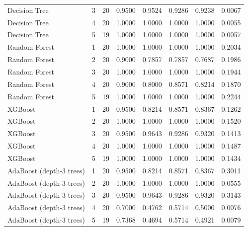 \begin{tabular}{lrrrrrrr}
Decision Tree & 3 & 20 & 0.9500 & 0.9524 & 0.9286 & 0.9238 & 0.0067 \\
Decision Tree & 4 & 20 & 1.0000 & 1.0000 & 1.0000 & 1.0000 & 0.0055 \\
Decision Tree & 5 & 19 & 1.0000 & 1.0000 & 1.0000 & 1.0000 & 0.0057 \\
Random Forest & 1 & 20 & 1.0000 & 1.0000 & 1.0000 & 1.0000 & 0.2034 \\
Random Forest & 2 & 20 & 0.9000 & 0.7857 & 0.7857 & 0.7687 & 0.1986 \\
Random Forest & 3 & 20 & 1.0000 & 1.0000 & 1.0000 & 1.0000 & 0.1944 \\
Random Forest & 4 & 20 & 0.9000 & 0.8000 & 0.8571 & 0.8214 & 0.1870 \\
Random Forest & 5 & 19 & 1.0000 & 1.0000 & 1.0000 & 1.0000 & 0.2244 \\
XGBoost & 1 & 20 & 0.9500 & 0.8214 & 0.8571 & 0.8367 & 0.1262 \\
XGBoost & 2 & 20 & 1.0000 & 1.0000 & 1.0000 & 1.0000 & 0.1520 \\
XGBoost & 3 & 20 & 0.9500 & 0.9643 & 0.9286 & 0.9320 & 0.1413 \\
XGBoost & 4 & 20 & 1.0000 & 1.0000 & 1.0000 & 1.0000 & 0.1487 \\
XGBoost & 5 & 19 & 1.0000 & 1.0000 & 1.0000 & 1.0000 & 0.1434 \\
AdaBoost (depth-3 trees) & 1 & 20 & 0.9500 & 0.8214 & 0.8571 & 0.8367 & 0.3011 \\
AdaBoost (depth-3 trees) & 2 & 20 & 1.0000 & 1.0000 & 1.0000 & 1.0000 & 0.0555 \\
AdaBoost (depth-3 trees) & 3 & 20 & 0.9500 & 0.9643 & 0.9286 & 0.9320 & 0.3143 \\
AdaBoost (depth-3 trees) & 4 & 20 & 0.7000 & 0.4762 & 0.5714 & 0.5000 & 0.0076 \\
AdaBoost (depth-3 trees) & 5 & 19 & 0.7368 & 0.4694 & 0.5714 & 0.4921 & 0.0079 \\
\bottomrule
\end{tabular}
